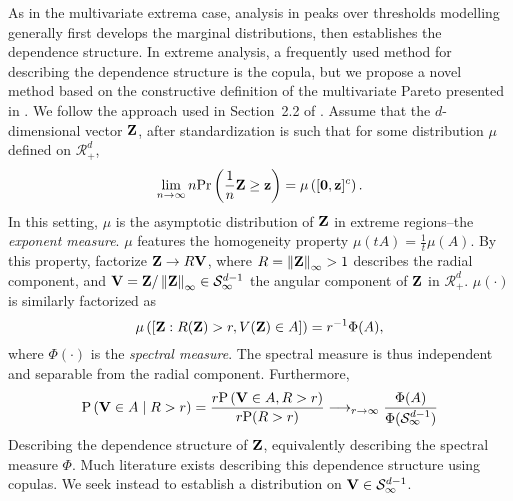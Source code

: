 As in the multivariate extrema case, analysis in peaks over thresholds modelling generally first
  develops the marginal distributions, then establishes the dependence structure.  In extreme analysis,
  a frequently used method for describing the dependence structure is the copula\needcite, but we
  propose a novel method based on the constructive definition of the multivariate Pareto presented in
  \cite{ferreira2014}.  We follow the approach used in Section~2.2 of \cite{goix2017}.  Assume that
  the $d$-dimensional vector ${\bf Z}$, after standardization is such that for some distribution
  $\mu$ defined on $\mathcal{R}_+^d$,
  \begin{equation}
    \lim\limits_{n\to\infty}n\text{Pr}\left(\frac{1}{n}{\bf Z}\geq {\bf z}\right) = \mu\left([{\bf 0},{\bf z}]^c\right).
  \end{equation}
  In this setting, $\mu$ is the asymptotic distribution of ${\bf Z}$ in extreme regions--the
  \emph{exponent measure}.  $\mu$ features the homogeneity property $\mu(tA) = \frac{1}{t}\mu(A)$.
  By this property, \cite{ferreira2014} factorize ${\bf Z}\to R{\bf V}$, where
  $R = \left\lVert {\bf Z} \right\rVert_{\infty} > 1$ describes the radial component, and
  ${\bf V} = {\bf Z}/\left\lVert {\bf Z} \right\rVert_{\infty} \in \mathcal{S}_{\infty}^{d-1}$ the angular component of
  ${\bf Z}$ in $\mathcal{R}_+^d$.  $\mu(\cdot)$ is similarly factorized as
  \begin{equation}
    \mu\left( [{\bf Z} : R({\bf Z}) > r, V({\bf Z}) \in A ] \right) = r^{-1}\Phi(A),
  \end{equation}
  where $\Phi(\cdot)$ is the \emph{spectral measure}.  The spectral measure is thus independent and
  separable from the radial component.  Furthermore,
  \begin{equation}
    \text{P}\left({\bf V} \in A \mid R > r\right)
      = \frac{r\text{P}\left({\bf V} \in A, R > r\right)}{r\text{P}(R > r)}
      \longrightarrow_{r\to\infty} \frac{\Phi(A)}{\Phi(\mathcal{S}_{\infty}^{d-1})}
  \end{equation}
  Describing the dependence structure of ${\bf Z}$, equivalently describing the spectral measure
  $\Phi$.  Much literature exists describing this dependence structure using copulas\needcite.
  We seek instead to establish a distribution on ${\bf V} \in \mathcal{S}_{\infty}^{d-1}$.




